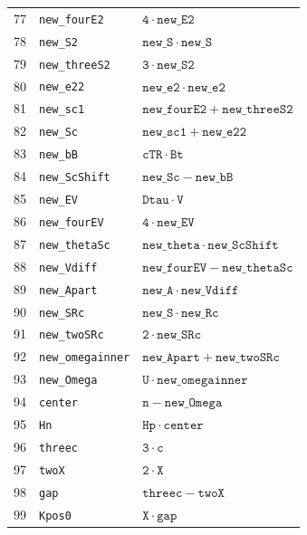 \begin{longtable}{rll}
77 & \texttt{new\_fourE2} & $\mathtt{4} \mathbin{\cdot} \mathtt{new\_E2}$ \\
78 & \texttt{new\_S2} & $\mathtt{new\_S} \mathbin{\cdot} \mathtt{new\_S}$ \\
79 & \texttt{new\_threeS2} & $\mathtt{3} \mathbin{\cdot} \mathtt{new\_S2}$ \\
80 & \texttt{new\_e22} & $\mathtt{new\_e2} \mathbin{\cdot} \mathtt{new\_e2}$ \\
81 & \texttt{new\_sc1} & $\mathtt{new\_fourE2} + \mathtt{new\_threeS2}$ \\
82 & \texttt{new\_Sc} & $\mathtt{new\_sc1} + \mathtt{new\_e22}$ \\
83 & \texttt{new\_bB} & $\mathtt{cTR} \mathbin{\cdot} \mathtt{Bt}$ \\
84 & \texttt{new\_ScShift} & $\mathtt{new\_Sc} - \mathtt{new\_bB}$ \\
85 & \texttt{new\_EV} & $\mathtt{Dtau} \mathbin{\cdot} \mathtt{V}$ \\
86 & \texttt{new\_fourEV} & $\mathtt{4} \mathbin{\cdot} \mathtt{new\_EV}$ \\
87 & \texttt{new\_thetaSc} & $\mathtt{new\_theta} \mathbin{\cdot} \mathtt{new\_ScShift}$ \\
88 & \texttt{new\_Vdiff} & $\mathtt{new\_fourEV} - \mathtt{new\_thetaSc}$ \\
89 & \texttt{new\_Apart} & $\mathtt{new\_A} \mathbin{\cdot} \mathtt{new\_Vdiff}$ \\
90 & \texttt{new\_SRc} & $\mathtt{new\_S} \mathbin{\cdot} \mathtt{new\_Rc}$ \\
91 & \texttt{new\_twoSRc} & $\mathtt{2} \mathbin{\cdot} \mathtt{new\_SRc}$ \\
92 & \texttt{new\_omegainner} & $\mathtt{new\_Apart} + \mathtt{new\_twoSRc}$ \\
93 & \texttt{new\_Omega} & $\mathtt{U} \mathbin{\cdot} \mathtt{new\_omegainner}$ \\
94 & \texttt{center} & $\mathtt{n} - \mathtt{new\_Omega}$ \\
95 & \texttt{Hn} & $\mathtt{Hp} \mathbin{\cdot} \mathtt{center}$ \\
96 & \texttt{threec} & $\mathtt{3} \mathbin{\cdot} \mathtt{c}$ \\
97 & \texttt{twoX} & $\mathtt{2} \mathbin{\cdot} \mathtt{X}$ \\
98 & \texttt{gap} & $\mathtt{threec} - \mathtt{twoX}$ \\
99 & \texttt{Kpos0} & $\mathtt{X} \mathbin{\cdot} \mathtt{gap}$ \\

\end{longtable}
